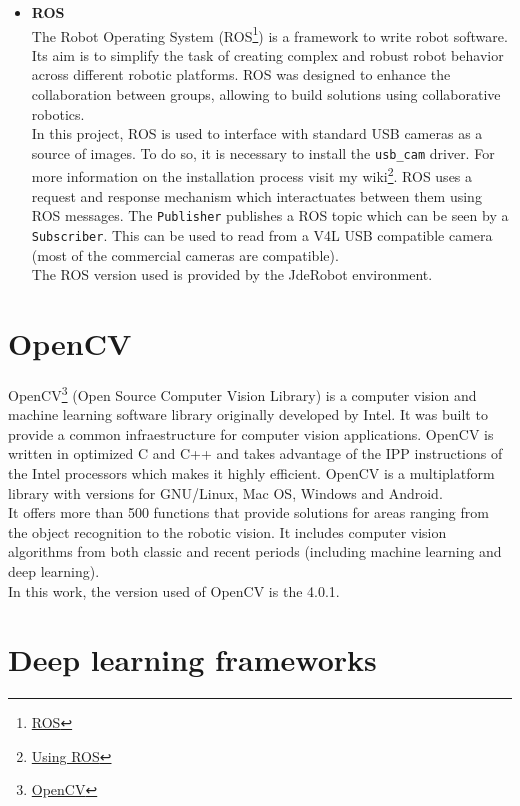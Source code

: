 \begin{itemize}
    \item \textbf{ROS}\\
The Robot Operating System (ROS\footnote {\href{https://www.ros.org/}{ROS}}) is a framework to write robot software. Its aim is to simplify the task of creating complex and robust robot behavior across different robotic platforms. ROS was designed to enhance the collaboration between groups, allowing to build solutions using collaborative robotics.\\
In this project, ROS is used to interface with standard USB cameras as a source of images. To do so, it is necessary to install the \texttt{usb\_cam} driver. For more information on the installation process visit my wiki\footnote {\label{using_ros}\href{https://jderobot.org/Arodriguez-tfm\#Week_24:_Introducing_ROS}{Using ROS}}. ROS uses a request and response mechanism which interactuates between them using ROS messages. The \texttt{Publisher} publishes a ROS topic which can be seen by a \texttt{Subscriber}. This can be used to read from a V4L USB compatible camera (most of the commercial cameras are compatible).\\
The ROS version used is provided by the JdeRobot environment.
\end{itemize}
\section{OpenCV}
OpenCV\footnote {\href{https://opencv.org/}{OpenCV}} (Open Source Computer Vision Library) is a computer vision and machine learning software library originally developed by Intel. It was built to provide a common infraestructure for computer vision applications. OpenCV is written in optimized C and C++ and takes advantage of the IPP instructions of the Intel processors which makes it highly efficient. OpenCV is a multiplatform library with versions for GNU/Linux, Mac OS, Windows and Android.\\ It offers more than 500 functions that provide solutions for areas ranging from the object recognition to the robotic vision. It includes computer vision algorithms from both classic and recent periods (including machine learning and deep learning).\\
In this work, the version used of OpenCV is the 4.0.1.

\section{Deep learning frameworks}

